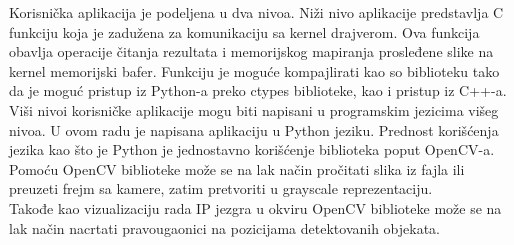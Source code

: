 Korisnička aplikacija je podeljena u dva nivoa.
Niži nivo aplikacije predstavlja C funkciju koja je zadužena za komunikaciju sa
kernel drajverom.
Ova funkcija obavlja operacije čitanja rezultata i memorijskog mapiranja prosleđene slike na
kernel memorijski bafer.
Funkciju je moguće kompajlirati kao \gls{so} biblioteku tako da je moguć pristup
iz Python-a preko ctypes biblioteke, kao i pristup iz C++-a. \\

Viši nivoi korisničke aplikacije mogu biti napisani u programskim jezicima višeg
nivoa.
U ovom radu je napisana aplikaciju u Python jeziku.
Prednost korišćenja jezika kao što je Python je jednostavno korišćenje
biblioteka poput OpenCV-a.
Pomoću OpenCV biblioteke može se na lak način pročitati slika iz fajla ili
preuzeti frejm sa kamere, zatim pretvoriti u grayscale reprezentaciju. \\
Takođe kao vizualizaciju rada IP jezgra u okviru OpenCV biblioteke može se na
lak način nacrtati pravougaonici na pozicijama detektovanih objekata. \\
